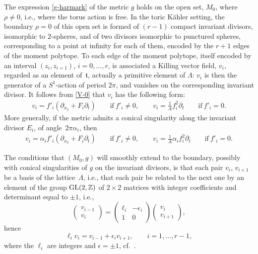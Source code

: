 \documentclass[pdftex]{sigma}
\numberwithin{equation}{section}
\begin{document}
The expression \eqref{g-harmark} of the metric $g$ holds on the open set, $M _0$, where $\rho \neq 0$, i.e., where the torus action is free. In the toric K\"ahler setting, the boundary $\rho = 0$ of this open set is formed of $(r - 1)$ compact invariant divisors, isomorphic to $2$-spheres, and of two divisors isomorphic to punctured spheres, corresponding to a point at infinity for each of them, encoded by the $r + 1$ edges of the moment polytope. To each edge of the moment polytope, itself encoded by an interval $(z_i, z_{i = 1})$, $i = 0, \dots, r$, is associated a Killing vector field, $v_i$, regarded as an element of~$\mathfrak{t}$, actually a primitive element of $\Lambda$: $v_i$ is then the generator of a $S^1$-action of period $2 \pi$, and vanishes on the corresponding invariant divisor. It follows from \eqref{V-0} that $v _i$ has the following form:
\begin{gather} v _i = f'_i (\partial _{x_3} + F _i \partial _t) \qquad \text{if}\ f'_i \neq 0, \qquad
 v _i = \frac{1}{A} f_i ^2 \partial _t \qquad \text{if}\ f'_i = 0. \label{v}
\end{gather}
 More generally, if the metric admits a conical singularity along the invariant divisor $E _i$, of angle~$2 \pi \alpha _i$, then
 \begin{gather}
 v _i = \alpha _i f'_i (\partial _{x_3} + F _i \partial _t) \qquad \text{if}\ f'_i \neq 0, \qquad
 v _i = \frac{1}{A} \alpha _i f_i ^2 \partial _t \qquad \text{if}\ f'_i = 0.\label{v-alpha}
\end{gather}


The conditions that $(M_0, g)$ will smoothly extend to the boundary, possibly with conical singularities of $g$ on the invariant divisors, is that each pair $v _i$, $v_{i + 1}$ be a basis of the lattice~$\Lambda$, i.e., that each pair be related to the next one by an element of the group ${\rm GL} (2, \mathbb{Z})$ of $2 \times 2$ matrices with integer coefficients and determinant equal to $ \pm 1$, i.e.,
\[ \begin{pmatrix} v_{i - 1} \\ v_i \end{pmatrix} = \begin{pmatrix} \ell _i & - \epsilon _i \\ 1 & 0 \end{pmatrix} \begin{pmatrix} \label{v-matrix} v _i \\ v _{i + 1} \end{pmatrix}, \]
hence
\[%
\ell _i v _i = v_{i - 1} + \epsilon _i v _{i + 1}, \qquad i = 1, \dots, r - 1, \]
where the $\ell _i$ are integers and $\epsilon = \pm 1$, cf.\ \cite[Section~8]{BG}.
\end{document}
